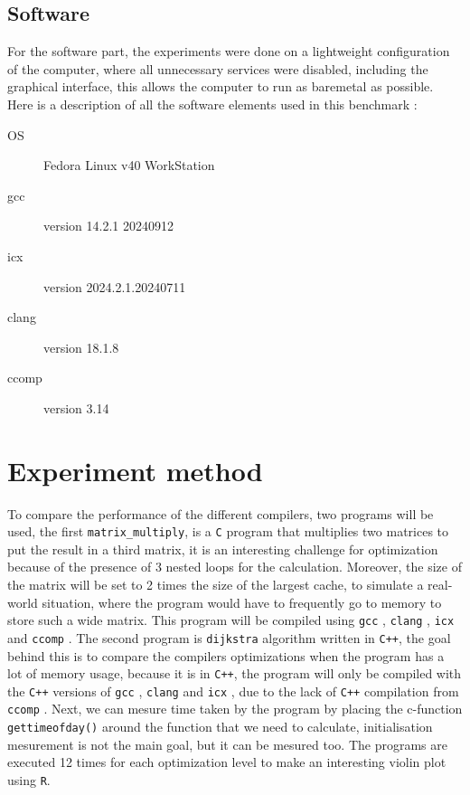 \documentclass{rapport}
\newcommand{\gcc}{\texttt{gcc} }
\newcommand{\icx}{\texttt{icx} }
\newcommand{\clang}{\texttt{clang} }
\newcommand{\comp}{\texttt{ccomp} }
\begin{document}
\subsection*{Software}
For the software part, the experiments were done on a lightweight configuration of the computer, where all unnecessary services were disabled, 
including the graphical interface, this allows the computer to run as baremetal as possible. \newline
Here is a description of all the software elements used in this benchmark :
\begin{description}
    \item[OS] Fedora Linux v40 WorkStation
    \item[gcc] version 14.2.1 20240912
    \item[icx] version 2024.2.1.20240711
    \item[clang] version 18.1.8
    \item[ccomp] version 3.14
\end{description}

\section{Experiment method}
To compare the performance of the different compilers, two programs will be used, the first \texttt{matrix\_multiply}, is a \texttt{C} program 
that multiplies two matrices to put the result in a third matrix, it is an interesting challenge for optimization because of the presence of 3 nested loops for 
the calculation. Moreover, the size of the matrix will be set to 2 times the size of the largest cache, to simulate a real-world situation, where the program would have to frequently go 
to memory to store such a wide matrix. This program will be compiled using \gcc, \clang, \icx and \comp. \newline
The second program is \texttt{dijkstra} algorithm written in \texttt{C++}, the goal behind this is to compare the compilers optimizations when the program has a lot
of memory usage, because it is in \texttt{C++}, the program will only be compiled with the \texttt{C++} versions of \gcc, \clang and \icx, due to the lack of \texttt{C++}
compilation from \comp. \newline
Next, we can mesure time taken by the program by placing the c-function \texttt{gettimeofday()} around the function that we need to calculate, initialisation 
mesurement is not the main goal, but it can be mesured too. The programs are executed 12 times for each optimization level to make an interesting violin plot using \texttt{R}.
\end{document}
